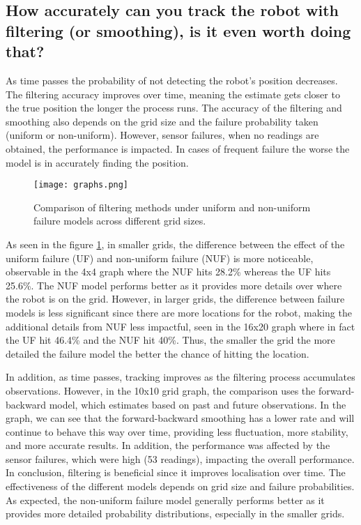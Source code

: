 \documentclass{article}
\begin{document}
\subsection*{How accurately can you track the robot with filtering (or smoothing), is it even worth doing that?}
\indent

As time passes the probability of not detecting the robot's position decreases. The filtering accuracy improves over time, meaning the estimate gets closer to the true position the longer the process runs. The accuracy of the filtering and smoothing also depends on the grid size and the failure probability taken (uniform or non-uniform). However, sensor failures, when no readings are obtained, the performance is impacted. In cases of frequent failure the worse the model is in accurately finding the position.

\begin{figure}[H]
    \centering
    \begin{minipage}{0.8\textwidth}
        \begin{mdframed}[linewidth=2pt, roundcorner=10pt, backgroundcolor=white]
            \centering
            \texttt{[image: graphs.png]}
        \end{mdframed}
        \caption{Comparison of filtering methods under uniform and non-uniform failure models across different grid sizes.}
        \label{fig:filter_comparation}
    \end{minipage}
\end{figure}

As seen in the figure \ref{fig:filter_comparation}, in smaller grids, the difference between the effect of the uniform failure (UF) and non-uniform failure (NUF) is more noticeable, observable in the 4x4 graph where the NUF hits 28.2\% whereas the UF hits 25.6\%. The NUF model performs better as it provides more details over where the robot is on the grid. However, in larger grids, the difference between failure models is less significant since there are more locations for the robot, making the additional details from NUF less impactful, seen in the 16x20 graph where in fact the UF hit 46.4\% and the NUF hit 40\%. Thus, the smaller the grid the more detailed the failure model the better the chance of hitting the location.

In addition, as time passes, tracking improves as the filtering process accumulates observations. However, in the 10x10 grid graph, the comparison uses the forward-backward model, which estimates based on past and future observations. In the graph, we can see that the forward-backward smoothing has a lower rate and will continue to behave this way over time, providing less fluctuation, more stability, and more accurate results. In addition, the performance was affected by the sensor failures, which were high (53 readings), impacting the overall performance.
In conclusion, filtering is beneficial since it improves localisation over time. The effectiveness of the different models depends on grid size and failure probabilities. As expected, the non-uniform failure model generally performs better as it provides more detailed probability distributions, especially in the smaller grids. 
\end{document}
